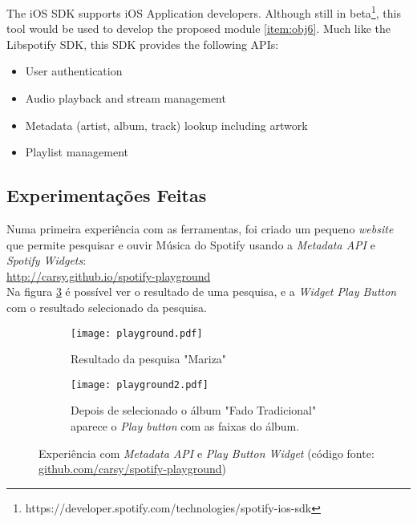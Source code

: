     The iOS SDK supports iOS Application developers. Although still in beta\footnote{https://developer.spotify.com/technologies/spotify-ios-sdk}, this tool would be used to develop the proposed module \ref{item:obj6}.
    Much like the Libspotify SDK, this SDK provides the following APIs:

    \begin{itemize}
      \item User authentication
      \item Audio playback and stream management
      \item Metadata (artist, album, track) lookup including artwork
      \item Playlist management
    \end{itemize}



  \subsection{Experimentações Feitas} %
  \label{sub:experimentacoes}
  
    Numa primeira experiência com as ferramentas, foi criado um pequeno \emph{website} que permite pesquisar e ouvir Música do Spotify usando a \emph{Metadata API} e \emph{Spotify Widgets}: \\

    \url{http://carsy.github.io/spotify-playground} \\

    Na figura \ref{fig:playground} é possível ver o resultado de uma pesquisa, e a \emph{Widget Play Button} com o resultado selecionado da pesquisa.

    \begin{figure}
      \centering

      \begin{subfigure}[b]{0.38\textwidth}
        \texttt{[image: playground.pdf]}
        \caption{Resultado da pesquisa "Mariza"}
        \label{fig:playgroun_a}
      \end{subfigure}

      \begin{subfigure}[b]{0.38\textwidth}
        \texttt{[image: playground2.pdf]}
        \caption{Depois de selecionado o álbum "Fado Tradicional" aparece o \emph{Play button} com as faixas do álbum.}
        \label{fig:playground_b}
      \end{subfigure}

      \caption{Experiência com \emph{Metadata API} e \emph{Play Button Widget} (código fonte: \url{github.com/carsy/spotify-playground})}
      \label{fig:playground}

    \end{figure}

